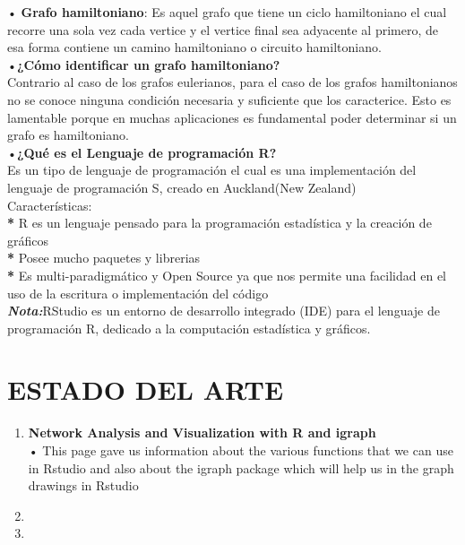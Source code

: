 \documentclass[journal]{IEEEtran}
\begin{document}
\vspace{0.2mm}
• \textbf{Grafo hamiltoniano}: Es aquel grafo que tiene un ciclo hamiltoniano el cual recorre una sola vez cada vertice y el vertice final sea adyacente al primero, de esa forma contiene un camino hamiltoniano o circuito hamiltoniano.\\


•\textbf{¿{C{\'o}mo identificar un grafo hamiltoniano}?}\\
Contrario al caso de los grafos eulerianos, para el caso de los grafos hamiltonianos no se conoce ninguna condici{\'o}n necesaria y suficiente que los caracterice. Esto es lamentable porque en muchas aplicaciones es fundamental poder determinar si un grafo es hamiltoniano.\\

\vspace{0.2mm}
•\textbf{¿{Qu{\'e} es el Lenguaje de programaci{\'o}n R}?}\\

Es un tipo de lenguaje de programaci{\'o}n el cual es una implementaci{\'o}n del lenguaje de programaci{\'o}n S, creado en Auckland(New Zealand)\\

Caracter{\'i}sticas:\\
\textbf{*} R es un lenguaje pensado para la programaci{\'o}n estad{\'i}stica y la creaci{\'o}n de gr{\'a}ficos\\
\textbf{*} Posee mucho paquetes y librerias\\
\textbf{*} Es multi-paradigm{\'a}tico y Open Source ya que nos permite una facilidad en el uso de la escritura o implementaci{\'o}n del c{\'o}digo\\
\textit{\textbf{Nota:}}RStudio es un entorno de desarrollo integrado (IDE) para el lenguaje de programación R, dedicado a la computación estadística y gráficos.\\


 
\section{\large\bf ESTADO DEL ARTE}

\begin{enumerate}

\item \textbf{Network Analysis and Visualization with R and igraph}\\[1cm]
• This page gave us information about the various functions that we can use in Rstudio and also about the igraph package which will help us in the graph drawings in Rstudio\\

\item 
\item 
\end{enumerate}
\end{document}
